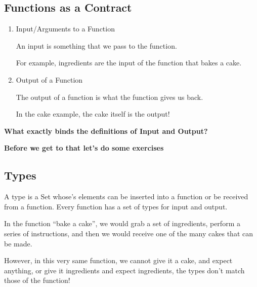 \documentclass[compress,svgnames,handout,13.7pt]{beamer}
\begin{document}
\subsection{Functions as a Contract}
\begin{frame}
    \begin{enumerate}
    \item{Input/Arguments to a Function}
    \pause\begin{definition}[Input]
        An input is something that we pass to the function.
    \end{definition} 
        For example, ingredients are the input of the function that bakes a cake.
    \pause\item{Output of a Function}
    \pause\begin{definition}[Output]
        The output of a function is what the function gives us back.
        \end{definition}
        In the cake example, the cake itself is the output!
    \end{enumerate}
\end{frame}

\begin{frame}
    \huge{\textbf{What exactly binds the definitions of Input and Output?}}
    \par
    \pause\large{\textbf{Before we get to that let's do some exercises}}
\end{frame}
\subsection{Types}
\begin{frame}
    \begin{definition}[Type]
        A type is a Set whose's elements can be inserted into a function
        or be received from a function. Every function has a set of types
        for input and output.
    \end{definition}
    \pause\begin{example}
        In the function ``bake a cake'', we would grab a set of ingredients,
        perform a series of instructions, and then we would receive one of the many
        cakes that can be made. \hfill \par
        \pause However, in this very same function, we cannot give it a cake,
        and expect anything, or give it ingredients and expect ingredients,
        the types don't match those of the function!
    \end{example}
\end{frame}
\end{document}
